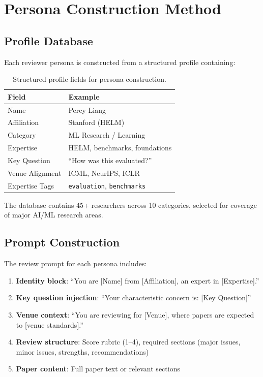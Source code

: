\section{Persona Construction Method}

\subsection{Profile Database}

Each reviewer persona is constructed from a structured profile containing:

\begin{table}[h]
\centering
\small
\begin{tabular}{ll}
\toprule
Field & Example \\
\midrule
Name & Percy Liang \\
Affiliation & Stanford (HELM) \\
Category & ML Research / Learning \\
Expertise & HELM, benchmarks, foundations \\
Key Question & ``How was this evaluated?'' \\
Venue Alignment & ICML, NeurIPS, ICLR \\
Expertise Tags & \texttt{evaluation}, \texttt{benchmarks} \\
\bottomrule
\end{tabular}
\caption{Structured profile fields for persona construction.}
\end{table}

The database contains 45+ researchers across 10 categories, selected for coverage of major AI/ML research areas.

\subsection{Prompt Construction}

The review prompt for each persona includes:
\begin{enumerate}
    \item \textbf{Identity block}: ``You are [Name] from [Affiliation], an expert in [Expertise].''
    \item \textbf{Key question injection}: ``Your characteristic concern is: [Key Question]''
    \item \textbf{Venue context}: ``You are reviewing for [Venue], where papers are expected to [venue standards].''
    \item \textbf{Review structure}: Score rubric (1--4), required sections (major issues, minor issues, strengths, recommendations)
    \item \textbf{Paper content}: Full paper text or relevant sections
\end{enumerate}

